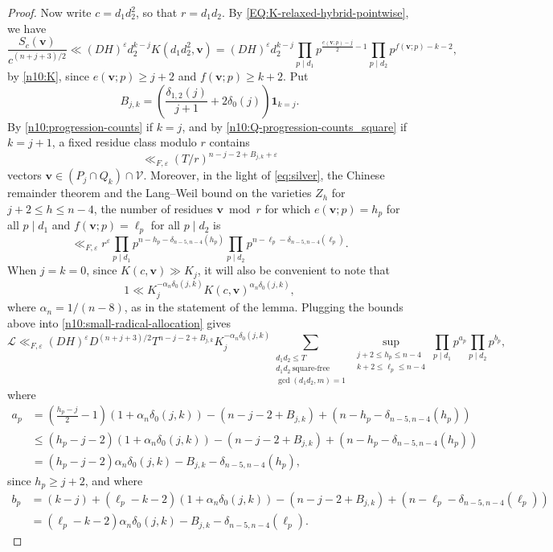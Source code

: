 \documentclass[a4paper,11pt, twoside,reqno]{amsart}
\theoremstyle{plain}
\theoremstyle{definition}
\theoremstyle{remark}
\newcommand{\bfv}{\bm{v}}
\newcommand{\ve}{\varepsilon}
\renewcommand{\le}{\leqslant}
\renewcommand{\ge}{\geqslant}
\numberwithin{equation}{section}
\begin{document}
\begin{proof}
Now write $c=d_1d_2^2$, so that $r=d_1d_2$.
By \eqref{EQ:K-relaxed-hybrid-pointwise}, we have
$$\frac{S_c(\bfv)}{c^{(n+j+3)/2}}
\ll (DH)^\ve d_2^{k-j} K(d_1d_2^2,\bfv)
= (DH)^\ve d_2^{k-j}
\prod_{p\mid d_1}
p^{\frac{e(\bfv;p)-j}{2}-1}
\prod_{p\mid d_2}
p^{f(\bfv;p)-k-2},$$
by \eqref{n10:K}, since $e(\bfv;p)\ge j+2$ and $f(\bfv;p)\ge k+2$.
Put
\[
B_{j,k}=\left(\frac{\delta_{1,2}(j)}{j+1}
+2\delta_0(j)\right) \bm1_{k=j}.
\]
By \eqref{n10:progression-counts} if $k=j$,
and by \eqref{n10:Q-progression-counts_square} if $k=j+1$,
a fixed residue class modulo $r$ contains
$$\ll_{F,\ve} (T/r)^{n-j-2+B_{j,k}+\ve}$$
vectors $\bfv\in(P_j\cap Q_k)\cap\mathcal V$.
Moreover, in the light of \eqref{eq:silver},  the Chinese remainder theorem
and the Lang--Weil bound on the varieties $Z_h$ for $j+2\le h\le n-4$,
the number of residues $\bfv\bmod{r}$ for which $e(\bfv;p) = h_p$ for all $p\mid d_1$
and $f(\bfv;p) = \ell_p$ for all $p\mid d_2$ is
\begin{equation*}
\ll_{F,\ve} r^\ve \prod_{p\mid d_1} p^{n-h_p-\delta_{n-5,n-4}(h_p)}
\prod_{p\mid d_2} p^{n-\ell_p-\delta_{n-5,n-4}(\ell_p)}.
\end{equation*}
When $j=k=0$, since $K(c,\bfv) \gg K_j$, it will also be convenient to note that
\begin{equation*}
1 \ll K_j^{-\alpha_n\delta_0(j,k)} K(c,\bfv)^{\alpha_n\delta_0(j,k)},
\end{equation*}
where $\alpha_n=1/(n-8)$, as in the statement of the lemma.
Plugging the bounds above into \eqref{n10:small-radical-allocation} gives
\begin{equation*}
\mathcal L \ll_{F,\ve} (DH)^\ve D^{(n+j+3)/2} T^{n-j-2+B_{j,k}} K_j^{-\alpha_n\delta_0(j,k)}
\sum_{\substack{d_1d_2\le T\\d_1d_2\ \mathrm{square\text{-}free}\\\gcd(d_1d_2,m)=1}}
\sup_{\substack{j+2\le h_p\le n-4 \\ k+2\le \ell_p\le n-4}}
\prod_{p\mid d_1} p^{a_p}
\prod_{p\mid d_2} p^{b_p},
\end{equation*}
where
\begin{equation*}
\begin{split}
a_p
&= (\tfrac{h_p-j}{2}-1) (1+\alpha_n\delta_0(j,k))
- (n-j-2+B_{j,k})
+ (n-h_p-\delta_{n-5,n-4}(h_p)) \\
&\le (h_p-j-2) (1+\alpha_n\delta_0(j,k))
- (n-j-2+B_{j,k})
+ (n-h_p-\delta_{n-5,n-4}(h_p)) \\
&= (h_p-j-2) \alpha_n\delta_0(j,k)
-B_{j,k}
-\delta_{n-5,n-4}(h_p),
\end{split}
\end{equation*}
since $h_p\ge j+2$,
and where
\begin{equation*}
\begin{split}
b_p &= (k-j)
+ (\ell_p-k-2) (1+\alpha_n\delta_0(j,k))
- (n-j-2+B_{j,k})
+ (n-\ell_p-\delta_{n-5,n-4}(\ell_p)) \\
&= (\ell_p-k-2) \alpha_n\delta_0(j,k)
-B_{j,k}
-\delta_{n-5,n-4}(\ell_p).
\end{split}
\end{equation*}


\end{proof}
\end{document}

